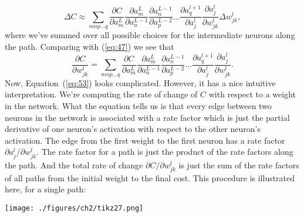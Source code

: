 \documentclass[a4paper,twoside,10pt]{book}
\begin{document}
\begin{equation}
	\Delta C \approx \sum_{mnp\ldots q} \frac{\partial C}{\partial a^L_m} 
	\frac{\partial a^L_m}{\partial a^{L-1}_n}
	\frac{\partial a^{L-1}_n}{\partial a^{L-2}_p} \ldots
	\frac{\partial a^{l+1}_q}{\partial a^l_j} 
	\frac{\partial a^l_j}{\partial w^l_{jk}} \Delta w^l_{jk},
	\tag{52}\label{eq:52}
\end{equation}
where we've summed over all possible choices for the intermediate neurons along the path. Comparing with (\ref{eq:47}) we see that
\begin{equation}
	\frac{\partial C}{\partial w^l_{jk}} = \sum_{mnp\ldots q} \frac{\partial C}{\partial a^L_m} 
	\frac{\partial a^L_m}{\partial a^{L-1}_n}
	\frac{\partial a^{L-1}_n}{\partial a^{L-2}_p} \ldots
	\frac{\partial a^{l+1}_q}{\partial a^l_j} 
	\frac{\partial a^l_j}{\partial w^l_{jk}}.
	\tag{53}\label{eq:53}
\end{equation}
Now, Equation~(\ref{eq:53}) looks complicated. However, it has a nice intuitive interpretation. We're computing the rate of change of $C$ with respect to a weight in the network. What the equation tells us is that every edge between two neurons in the network is associated with a rate factor which is just the partial derivative of one neuron's activation with respect to the other neuron's activation. The edge from the first weight to the first neuron has a rate factor $\partial{}a^l_j/\partial{}w^l_{jk}$. The rate factor for a path is just the product of the rate factors along the path. And the total rate of change $\partial{}C/\partial{}w^l_{jk}$ is just the sum of the rate factors of all paths from the initial weight to the final cost. This procedure is illustrated here, for a single path:
\begin{center}
	\texttt{[image: ./figures/ch2/tikz27.png]}
\end{center}
\end{document}
